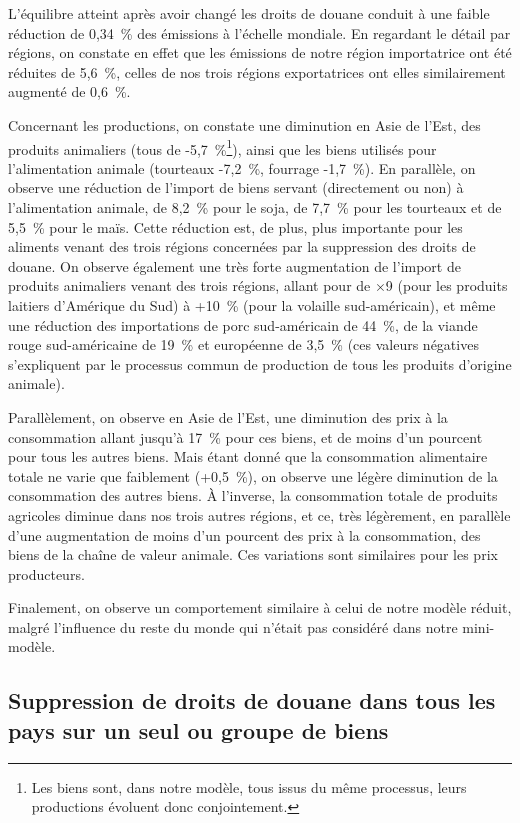 L'équilibre atteint après avoir changé les droits de douane conduit à une faible réduction de 0,34~\% des émissions à l'échelle mondiale. En regardant le détail par régions, on constate en effet que les émissions de notre région importatrice ont été réduites de 5,6~\%, celles de nos trois régions exportatrices ont elles similairement augmenté de 0,6~\%.

Concernant les productions, on constate une diminution en Asie de l'Est, des produits animaliers (tous de -5,7~\%\footnote{Les biens sont, dans notre modèle, tous issus du même processus, leurs productions évoluent donc conjointement.}), ainsi que les biens utilisés pour l'alimentation animale (tourteaux -7,2~\%, fourrage -1,7~\%). En parallèle, on observe une réduction de l'import de biens servant (directement ou non) à l'alimentation animale, de 8,2~\% pour le soja, de 7,7~\% pour les tourteaux et de 5,5~\% pour le maïs. Cette réduction est, de plus, plus importante pour les aliments venant des trois régions concernées par la suppression des droits de douane. On observe également une très forte augmentation de l'import de produits animaliers venant des trois régions, allant pour de $\times$9 (pour les produits laitiers d'Amérique du Sud) à +10~\% (pour la volaille sud-américain), et même une réduction des importations de porc sud-américain de 44~\%, de la viande rouge sud-américaine de 19~\% et européenne de 3,5~\% (ces valeurs négatives s'expliquent par le processus commun de production de tous les produits d'origine animale).

Parallèlement, on observe en Asie de l'Est, une diminution des prix à la consommation allant jusqu'à 17~\% pour ces biens, et de moins d'un pourcent pour tous les autres biens. Mais étant donné que la consommation alimentaire totale ne varie que faiblement (+0,5~\%), on observe une légère diminution de la consommation des autres biens. À l'inverse, la consommation totale de produits agricoles diminue dans nos trois autres régions, et ce, très légèrement, en parallèle d'une augmentation de moins d'un pourcent des prix à la consommation, des biens de la chaîne de valeur animale. Ces variations sont similaires pour les prix producteurs.

Finalement, on observe un comportement similaire à celui de notre modèle réduit, malgré l'influence du reste du monde qui n'était pas considéré dans notre mini-modèle.


\subsection{Suppression de droits de douane dans tous les pays sur un seul ou groupe de biens}

